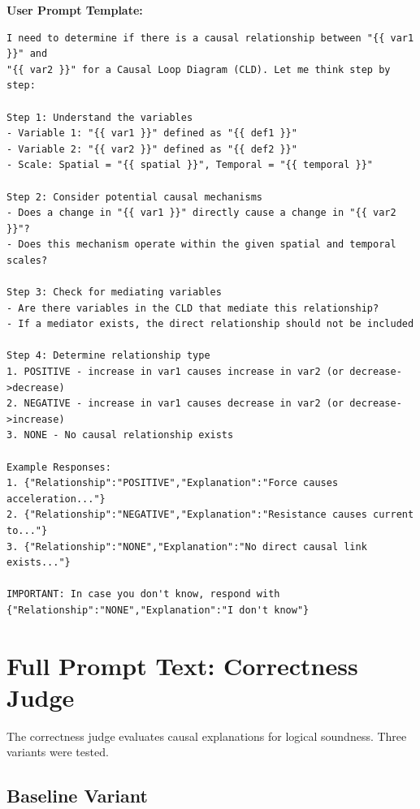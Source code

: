 \noindent\textbf{User Prompt Template:}
\begin{small}
\begin{verbatim}
I need to determine if there is a causal relationship between "{{ var1 }}" and
"{{ var2 }}" for a Causal Loop Diagram (CLD). Let me think step by step:

Step 1: Understand the variables
- Variable 1: "{{ var1 }}" defined as "{{ def1 }}"
- Variable 2: "{{ var2 }}" defined as "{{ def2 }}"
- Scale: Spatial = "{{ spatial }}", Temporal = "{{ temporal }}"

Step 2: Consider potential causal mechanisms
- Does a change in "{{ var1 }}" directly cause a change in "{{ var2 }}"?
- Does this mechanism operate within the given spatial and temporal scales?

Step 3: Check for mediating variables
- Are there variables in the CLD that mediate this relationship?
- If a mediator exists, the direct relationship should not be included

Step 4: Determine relationship type
1. POSITIVE - increase in var1 causes increase in var2 (or decrease->decrease)
2. NEGATIVE - increase in var1 causes decrease in var2 (or decrease->increase)
3. NONE - No causal relationship exists

Example Responses:
1. {"Relationship":"POSITIVE","Explanation":"Force causes acceleration..."}
2. {"Relationship":"NEGATIVE","Explanation":"Resistance causes current to..."}
3. {"Relationship":"NONE","Explanation":"No direct causal link exists..."}

IMPORTANT: In case you don't know, respond with
{"Relationship":"NONE","Explanation":"I don't know"}
\end{verbatim}
\end{small}

\section{Full Prompt Text: Correctness Judge}
\label{sec:correctness_judge_prompt_text}

The correctness judge evaluates causal explanations for logical soundness. Three variants were tested.

\subsection{Baseline Variant}
\label{sec:prompt_judge_correctness_baseline}

